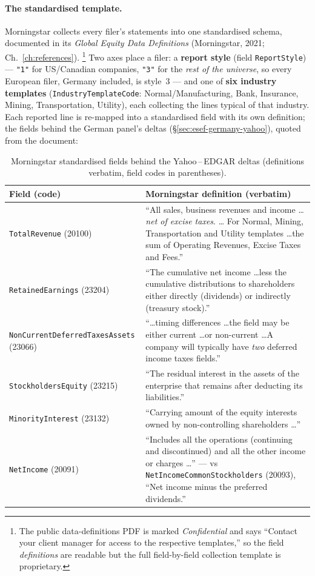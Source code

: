 \documentclass[11pt,a4paper]{report}
\begin{document}
\paragraph{The standardised template.} Morningstar collects every filer's statements into one standardised
schema, documented in its \emph{Global Equity Data Definitions} (Morningstar, 2021; Ch.~\ref{ch:references}).%
\footnote{The public data-definitions PDF is marked \emph{Confidential} and says ``Contact your client manager
for access to the respective templates,'' so the field \emph{definitions} are readable but the full
field-by-field collection template is proprietary.} Two axes place a filer: a \textbf{report style} (field
\texttt{ReportStyle}) --- \texttt{"1"} for US/Canadian companies, \texttt{"3"} for the \emph{rest of the
universe}, so every European filer, Germany included, is style~3 --- and one of \textbf{six industry templates}
(\texttt{IndustryTemplateCode}: Normal/Manufacturing, Bank, Insurance, Mining, Transportation, Utility), each
collecting the lines typical of that industry. Each reported line is re-mapped into a standardised field with
its own definition; the fields behind the German panel's deltas (\S\ref{sec:esef-germany-yahoo}), quoted from
the document:

\begin{table}[h]
\centering\small
\caption{Morningstar standardised fields behind the Yahoo\,--\,EDGAR deltas (definitions verbatim, field codes
in parentheses).}
\label{tab:morningstar-defs}
\begin{tabular}{@{}p{}p{}@{}}
\toprule
\textbf{Field (code)} & \textbf{Morningstar definition (verbatim)} \\
\midrule
\texttt{TotalRevenue} (20100) & ``All sales, business revenues and income \ldots \emph{net of excise taxes}. \ldots
For Normal, Mining, Transportation and Utility templates \ldots the sum of Operating Revenues, Excise Taxes and
Fees.'' \\
\texttt{RetainedEarnings} (23204) & ``The cumulative net income \ldots less the cumulative distributions to
shareholders either directly (dividends) or indirectly (treasury stock).'' \\
\texttt{NonCurrentDeferredTaxesAssets} (23066) & ``\ldots timing differences \ldots the field may be either
current \ldots or non-current \ldots A company will typically have \emph{two} deferred income taxes fields.'' \\
\texttt{StockholdersEquity} (23215) & ``The residual interest in the assets of the enterprise that remains after
deducting its liabilities.'' \\
\texttt{MinorityInterest} (23132) & ``Carrying amount of the equity interests owned by non-controlling
shareholders \ldots'' \\
\texttt{NetIncome} (20091) & ``Includes all the operations (continuing and discontinued) and all the other income
or charges \ldots'' --- vs \texttt{NetIncomeCommonStockholders} (20093), ``Net income minus the preferred
dividends.'' \\
\bottomrule
\end{tabular}
\end{table}
\end{document}
